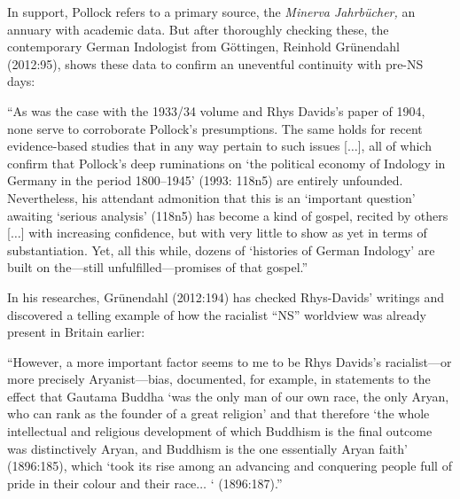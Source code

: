 In support, Pollock refers to a primary source, the {\sl Minerva Jahrbücher,} an annuary with academic data. But after thoroughly checking these, the contemporary German Indologist from Göttingen, Reinhold Grünendahl (2012:95), shows these data to confirm an uneventful continuity with pre-NS days: 
\smallskip

\begin{myquote}
“As was the case with the 1933/34 volume and Rhys Davids’s paper of 1904, none serve to corroborate Pollock’s presumptions. The same holds for recent evidence-based studies that in any way pertain to such issues [$\ldots$], all of which confirm that Pollock’s deep ruminations on ‘the political economy of Indology in Germany in the period 1800–1945’ (1993: 118n5) are entirely unfounded. Nevertheless, his attendant admonition that this is an ‘important question’ awaiting ‘serious analysis’ (118n5) has become a kind of gospel, recited by others [$\ldots$] with increasing confidence, but with very little to show as yet in terms of substantiation. Yet, all this while, dozens of ‘histories of German Indology’ are built on the—still unfulfilled—promises of that gospel.”
\end{myquote}
\smallskip

In his researches, Grünendahl (2012:194) has checked Rhys-Davids’ writings and discovered a telling example of how the racialist “NS” worldview was already present in Britain earlier:
\smallskip

\begin{myquote}
“However, a more important factor seems to me to be Rhys Davids’s racialist—or more precisely Aryanist—bias, documented, for example, in statements to the effect that Gautama Buddha ‘was the only man of our own race, the only Aryan, who can rank as the founder of a great religion’ and that therefore ‘the whole intellectual and religious development of which Buddhism is the final outcome was distinctively Aryan, and Buddhism is the one essentially Aryan faith’ (1896:185), which ‘took its rise among an advancing and conquering people full of pride in their colour and their race$\ldots$  ‘ (1896:187).”
\end{myquote}
\smallskip

